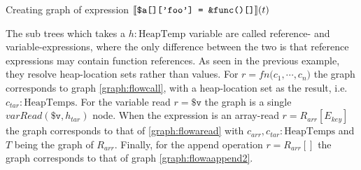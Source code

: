 \begin{graph}
\begin{adjustbox}{max size={.33\textwidth}{.33\textheight}}
\begin{tikzpicture}[node distance = 2cm, auto]
\end{tikzpicture}\end{adjustbox}
\begin{adjustbox}{max size={.33\textwidth}{.33\textheight}}\end{adjustbox}
\caption{Creating graph of expression $\subt{\texttt{\$a[]['foo']  = \&func()[]}}(t)$}
\label{graph:exassign}
\end{graph}

The sub trees which takes a $h : \text{HeapTemp}$ variable are called reference- and variable-expressions, where the only difference between the two is that reference expressions may contain function references. As seen in the previous example, they resolve heap-location sets rather than values. For $r = \mathit{fn} \texttt{(}c_1, \cdots, c_n\texttt{)}$ the graph corresponds to graph \ref{graph:flowcall}, with a heap-location set as the result, i.e. $c_{tar} : \text{HeapTemps}$. For the variable read $r = \texttt{\$v}$ the graph is a single $\mathit{varRead}(\texttt{\$v}, h_{tar})$ node. When the expression is an array-read $r= R_{arr}[E_{key}]$ the graph corresponds to that of \ref{graph:flowaread} with $c_{arr},c_{tar} : \text{HeapTemps}$ and $T$ being the graph of $R_{arr}$. Finally, for the append operation $r = R_{arr}[]$ the graph corresponds to that of graph \ref{graph:flowaappend2}.